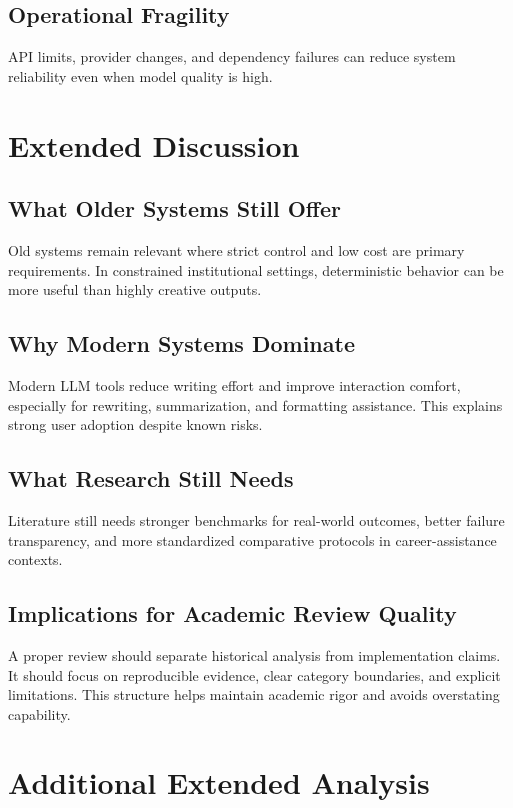 \documentclass[conference]{IEEEtran}
\begin{document}
\subsection{Operational Fragility}
API limits, provider changes, and dependency failures can reduce system reliability even when model quality is high.

\section{Extended Discussion}
\subsection{What Older Systems Still Offer}
Old systems remain relevant where strict control and low cost are primary requirements. In constrained institutional settings, deterministic behavior can be more useful than highly creative outputs.

\subsection{Why Modern Systems Dominate}
Modern LLM tools reduce writing effort and improve interaction comfort, especially for rewriting, summarization, and formatting assistance. This explains strong user adoption despite known risks.

\subsection{What Research Still Needs}
Literature still needs stronger benchmarks for real-world outcomes, better failure transparency, and more standardized comparative protocols in career-assistance contexts.

\subsection{Implications for Academic Review Quality}
A proper review should separate historical analysis from implementation claims. It should focus on reproducible evidence, clear category boundaries, and explicit limitations. This structure helps maintain academic rigor and avoids overstating capability.

\section{Additional Extended Analysis}
\end{document}
